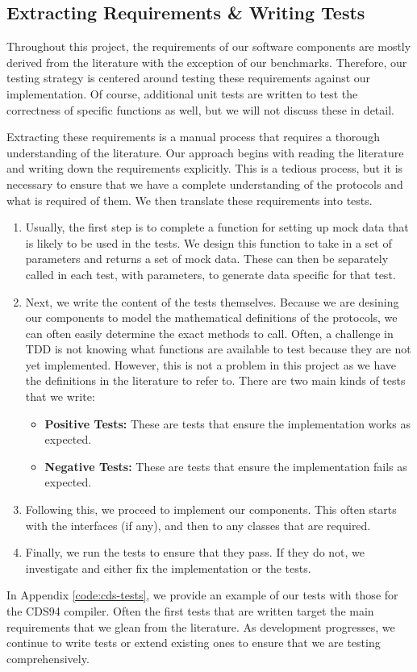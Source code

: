\subsection{Extracting Requirements \& Writing Tests}
Throughout this project, the requirements of our software components are mostly derived 
from the literature with the exception of our benchmarks. Therefore, our testing 
strategy is centered around testing these requirements against our implementation. Of 
course, additional unit tests are written to test the correctness of specific functions
as well, but we will not discuss these in detail. 

Extracting these requirements is a manual process that requires a thorough 
understanding of the literature. Our approach begins with reading the literature and
writing down the requirements explicitly. This is a tedious process,
but it is necessary to ensure that we have a complete understanding of the protocols
and what is required of them. We then translate these requirements into tests. 
\begin{enumerate}
  \item Usually, the first step is to complete a function for setting up mock data 
  that is likely to be used in the tests. We design this function to take in a set of 
  parameters and returns a set of mock data. These can then be separately called in 
  each test, with parameters, to generate data specific for that test. 
  \item Next, we write the content of the tests themselves. Because we are desining our 
  components to model the mathematical definitions of the protocols, we can often easily 
  determine the exact methods to call. Often, a 
  challenge in TDD is not knowing what functions are available to test because they 
  are not yet implemented. However, this is not a problem in this project as we have 
  the definitions in the literature to refer to. There are two main kinds of tests 
  that we write:
  \begin{itemize}
    \item \textbf{Positive Tests:} These are tests that ensure the implementation
    works as expected. 
    \item \textbf{Negative Tests:} These are tests that ensure the implementation
    fails as expected.
  \end{itemize}
  \item Following this, we proceed to implement our components. This often starts with 
  the interfaces (if any), and then to any classes that are required. 
  \item Finally, we run the tests to ensure that they pass. If they do not, we 
  investigate and either fix the implementation or the tests.
\end{enumerate}

In Appendix \ref{code:cds-tests}, we provide an example of our tests with those 
for the CDS94 compiler. Often the first tests that are written target the main 
requirements that we glean from the literature. As development progresses, we 
continue to write tests or extend existing ones to ensure that we are testing 
comprehensively. 
